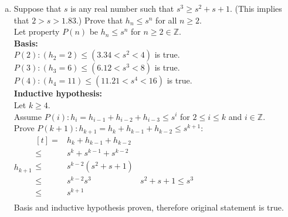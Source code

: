 \documentclass[letterpaper,fleqn,leqno]{article}
\begin{document}
\begin{enumerate}[(a)]
{\begin{enumerate}[(a)]
				\item
				Suppose that $s$ is any real number such that $s^3\geq s^2+s+1$. (This implies that $2>s>1.83$.) Prove that $h_n\leq s^n$ for all $n\geq2$. \\
				Let property $P(n)$ be $h_n\leq s^n$ for $n\geq2\in\mathbb{Z}$. \\
				\textbf{Basis:} \\
				$P(2): (h_2=2)\leq(3.34<s^2<4)$ is true. \\
				$P(3): (h_3=6)\leq(6.12<s^3<8)$ is true. \\
				$P(4): (h_4=11)\leq(11.21<s^4<16)$ is true. \\
				\textbf{Inductive hypothesis:} \\
				Let $k\geq4$. \\
				Assume $P(i): h_i=h_{i-1}+h_{i-2}+h_{i-3}\leq s^i$ for $2\leq i\leq k$ and $i\in\mathbb{Z}$. \\
				Prove $P(k+1): h_{k+1}=h_k+h_{k-1}+h_{k-2}\leq s^{k+1}$: \\
				$h_{k+1}\begin{aligned}[t]
					= & h_k+h_{k-1}+h_{k-2} \\
					\leq & s^k+s^{k-1}+s^{k-2} \\
					\leq & s^{k-2}\left(s^2+s+1\right) \\
					\leq & s^{k-2}s^3 & \text{$s^2+s+1\leq s^3$} \\
					\leq & s^{k+1} \\
				\end{aligned}$ \\
				Basis and inductive hypothesis proven, therefore original statement is true. \\
			\end{enumerate}
		}
\end{enumerate}
\end{document}

